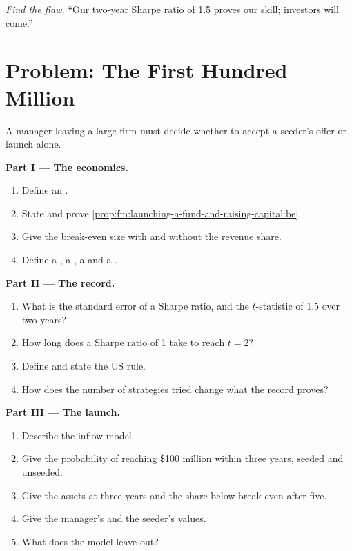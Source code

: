 \begin{exercise}[$\star\star\star$]\label{exo:fm:launching-a-fund-and-raising-capital:8}
\emph{Find the flaw.} ``Our two-year Sharpe ratio of 1.5 proves our skill; investors will come.''
\end{exercise}

\section{Problem: The First Hundred Million}

\begin{problem}\label{pb:fm:launching-a-fund-and-raising-capital:1}
A manager leaving a large firm must decide whether to accept a seeder's offer or launch alone.

\medskip\noindent\textbf{Part I --- The economics.}
\begin{enumerate}
\item Define an .
\item State and prove \cref{prop:fm:launching-a-fund-and-raising-capital:be}.
\item Give the break-even size with and without the revenue share.
\item Define a , a , a  and a .
\end{enumerate}

\medskip\noindent\textbf{Part II --- The record.}
\begin{enumerate}[resume]
\item What is the standard error of a Sharpe ratio, and the $t$-statistic of 1.5 over two years?
\item How long does a Sharpe ratio of 1 take to reach $t=2$?
\item Define  and state the US rule.
\item How does the number of strategies tried change what the record proves?
\end{enumerate}

\medskip\noindent\textbf{Part III --- The launch.}
\begin{enumerate}[resume]
\item Describe the inflow model.
\item Give the probability of reaching \$100 million within three years, seeded and unseeded.
\item Give the assets at three years and the share below break-even after five.
\item Give the manager's and the seeder's values.
\item What does the model leave out?
\end{enumerate}


\end{problem}
